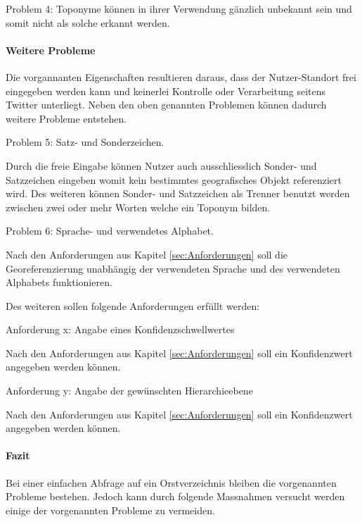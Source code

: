 				Problem 4: Toponyme können in ihrer Verwendung gänzlich unbekannt sein und somit nicht als solche erkannt werden.

			\paragraph{Weitere Probleme}
				Die vorgannanten Eigenschaften resultieren daraus, dass der Nutzer-Standort frei eingegeben werden kann und keinerlei Kontrolle oder Verarbeitung seitens Twitter unterliegt. 
				Neben den oben genannten Problemen können dadurch weitere Probleme entstehen.

				Problem 5: Satz- und Sonderzeichen.

				Durch die freie Eingabe können Nutzer auch ausschliesslich Sonder- und Satzzeichen eingeben womit kein bestimmtes geografisches Objekt referenziert wird. 
				Des weiteren können Sonder- und Satzzeichen als Trenner benutzt werden zwischen zwei oder mehr Worten welche ein Toponym bilden.
				
				Problem 6: Sprache- und verwendetes Alphabet.

				Nach den Anforderungen aus Kapitel \ref{sec:Anforderungen} soll die Georeferenzierung unabhängig der verwendeten Sprache und des verwendeten Alphabets funktionieren.

				Des weiteren sollen folgende Anforderungen erfüllt werden:

				Anforderung x: Angabe eines Konfidenzschwellwertes

				Nach den Anforderungen aus Kapitel \ref{sec:Anforderungen} soll ein Konfidenzwert angegeben werden können.

				Anforderung y: Angabe der gewünschten Hierarchieebene 

				Nach den Anforderungen aus Kapitel \ref{sec:Anforderungen} soll ein Konfidenzwert angegeben werden können.

			\paragraph{Fazit} 

				Bei einer einfachen Abfrage auf ein Orstverzeichnis bleiben die vorgenannten Probleme bestehen.
				Jedoch kann durch folgende Massnahmen versucht werden einige der vorgenannten Probleme zu vermeiden. 

